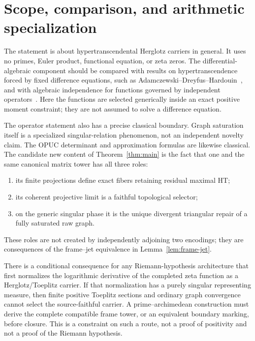 \documentclass[11pt]{article}
\begin{document}
\section{Scope, comparison, and arithmetic specialization}\label{sec:scope}

The statement is about hypertranscendental Herglotz carriers in general.  It uses no primes,
Euler product, functional equation, or zeta zeros.  The differential-algebraic component should be
compared with results on hypertranscendence forced by fixed difference equations, such as
Adamczewski--Dreyfus--Hardouin~\cite{ADH2021}, and with algebraic independence for functions
governed by independent operators~\cite{ADHW2024}.  Here the functions are selected generically
inside an exact positive moment constraint; they are not assumed to solve a difference equation.

The operator statement also has a precise classical boundary.  Graph saturation itself is a
specialized singular-relation phenomenon, not an independent novelty claim.  The OPUC determinant
and approximation formulas are likewise classical.  The candidate new content of
Theorem~\ref{thm:main} is the fact that one and the same canonical matrix tower has all three
roles:
\begin{enumerate}[leftmargin=*]
  \item its finite projections define exact fibers retaining residual maximal HT;
  \item its coherent projective limit is a faithful topological selector;
  \item on the generic singular phase it is the unique divergent triangular repair of a fully
  saturated raw graph.
\end{enumerate}
These roles are not created by independently adjoining two encodings; they are consequences of
the frame--jet equivalence in Lemma~\ref{lem:frame-jet}.

There is a conditional consequence for any Riemann-hypothesis architecture that first normalizes
the logarithmic derivative of the completed zeta function as a Herglotz/Toeplitz carrier.  If that
normalization has a purely singular representing measure, then finite positive Toeplitz sections
and ordinary graph convergence cannot select the source-faithful carrier.  A prime--archimedean
construction must derive the complete compatible frame tower, or an equivalent boundary marking,
before closure.  This is a constraint on such a route, not a proof of positivity and not a proof of
the Riemann hypothesis.
\end{document}
